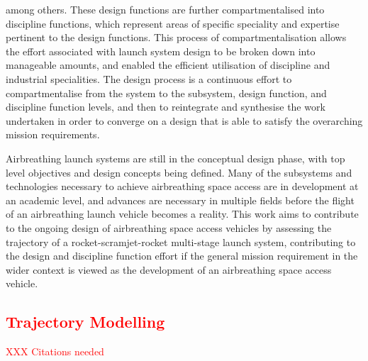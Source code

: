 among others\cite{Blair2001}. These design functions are further compartmentalised into discipline functions, which represent areas of specific speciality and expertise pertinent to the design functions. This process of compartmentalisation allows the effort associated with launch system design to be broken down into manageable amounts, and enabled the efficient utilisation of discipline and industrial specialities. 
The design process is a continuous effort to compartmentalise from the system to the subsystem, design function, and discipline function levels, and then to reintegrate and synthesise the work undertaken in order to converge on a design that is able to satisfy the overarching mission requirements\cite{Blair2001}.


 	Airbreathing launch systems are still in the conceptual design phase, with top level objectives and design concepts being defined. Many of the subsystems and technologies necessary to achieve airbreathing space access are in development at an academic level, and advances are necessary in multiple fields before the flight of an airbreathing launch vehicle becomes a reality. This work aims to contribute to the ongoing design of airbreathing space access vehicles by assessing the trajectory of a rocket-scramjet-rocket multi-stage launch system, contributing to the design and discipline function effort if the general mission requirement in the wider context is viewed as the development of an airbreathing space access vehicle.
 



  \textcolor{red}{
  	\subsection{Trajectory Modelling}
  }

\textcolor{red}{XXX Citations needed}




